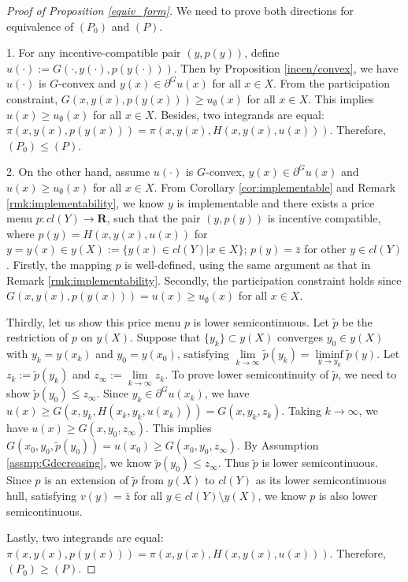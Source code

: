 \documentclass[a4paper, 11pt]{amsart}
\numberwithin{equation}{section}
\theoremstyle{plain}
\theoremstyle{definition}
\theoremstyle{remark}
\newcommand{\R}{\mathbf{R}}
\begin{document}
\begin{proof} [Proof of Proposition \ref{equiv_form}] We need to prove both directions for equivalence of $(P_0)$ and $(P)$.\medskip
	
	1. For any incentive-compatible pair $(y, p(y))$, define $u(\cdot) := G(\cdot,y(\cdot), p(y(\cdot)))$. Then by Proposition \ref{incen/convex}, we have $u(\cdot)$ is $G$-convex and $y(x) \in \partial^G u(x)$ for all $x \in X$. From the participation constraint, $G(x, y(x), p(y(x))) \ge u_{\emptyset}(x)$ for all $x\in X$. This implies $u(x)\ge u_{\emptyset}(x)$ for all $x\in X$. Besides, two integrands are equal: $\pi(x, y(x), p(y(x))) = \pi(x,y(x), H(x,y(x), u(x)))$. Therefore, $(P_0) \le (P)$.\medskip
	
	2. On the other hand, assume $u(\cdot)$ is $G$-convex, $y(x)\in \partial^G u(x)$ and $u(x) \ge u_{\emptyset}(x)$ for all $x \in X$. From Corollary \ref{cor:implementable} and Remark \ref{rmk:implementability}, we know $y$ is implementable and there exists a price menu $p: cl(Y) \longrightarrow \R$, such that the pair $(y, p(y))$ is incentive compatible, where $p(y) = H(x,y(x), u(x))$ for $y = y(x) \in y(X) :=\{ y(x) \in cl(Y) | x \in X \}$; $p(y) = \bar{z}$ for other $y\in cl(Y)$. Firstly, the mapping $p$ is well-defined, using the same argument as that in Remark \ref{rmk:implementability}. %
	Secondly, the participation constraint holds since $G(x,y(x), p(y(x))) = u(x) \ge u_{\emptyset}(x)$ for all $x\in X$. \medskip
	
	Thirdly, let us show this price menu $p$ is lower semicontinuous. Let $\tilde{p}$ be the restriction of $p$ on $y(X)$. Suppose that $\{y_k \} \subset y(X)$ converges $y_0 \in y(X)$ with $y_k = y(x_k)$ and $y_0 = y(x_0)$, satisfying $\lim\limits_{k \longrightarrow \infty} \tilde{p}(y_k) = \liminf\limits_{y \longrightarrow y_{0}} \tilde{p}(y)$.  Let $z_{k}:= \tilde{p}(y_k)$ and $z_{\infty}:=\lim\limits_{k \longrightarrow \infty} z_k$. To prove lower semicontinuity of $\tilde{p}$, we need to show $\tilde{p}(y_0)\le z_{\infty}$.  Since $y_k \in \partial^G u(x_k)$, we have $u(x) \ge G(x,y_k, H(x_k, y_k, u(x_k))) = G(x, y_k, z_k)$. Taking $k\longrightarrow \infty$, we have $u(x)\ge G(x, y_0, z_{\infty})$. This implies $G(x_0, y_0, \tilde{p}(y_0)) = u(x_0) \ge G(x_0, y_0, z_{\infty})$. By Assumption \ref{assmp:Gdecreasing}, we know $\tilde{p}(y_0) \le z_{\infty}$. Thus $\tilde{p}$ is lower semicontinuous. Since $p$ is an extension of $\tilde{p}$ from $y(X)$ to $cl(Y)$ as its lower semicontinuous hull, satisfying $v(y)= \bar{z}$ for all $y\in cl(Y)\setminus y(X)$, we know $p$ is also lower semicontinuous.
	\medskip
	
	Lastly, two integrands are equal: $\pi(x, y(x), p(y(x))) = \pi(x,y(x), H(x,y(x), u(x)))$. Therefore, $(P_0) \ge (P)$.
\end{proof}
\end{document}

